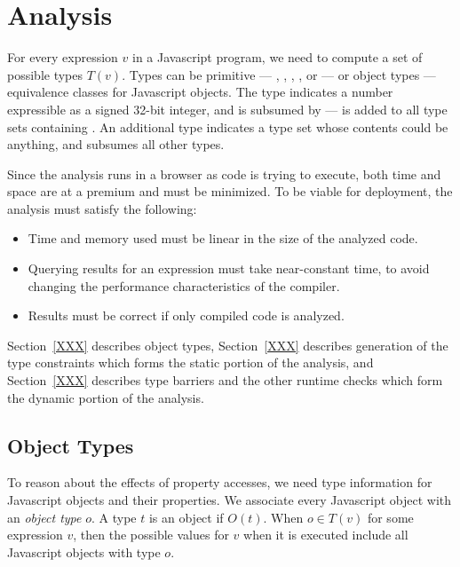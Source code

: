 
\section{Analysis}

For every expression $v$ in a Javascript program,
we need to compute a set of possible types $T(v)$.
Types can be primitive --- , , ,
, 
or  --- or object types --- equivalence classes for
Javascript objects.
The  type indicates a number expressible as a signed 32-bit integer,
and is subsumed by  ---  is added to all type
sets containing .
An additional type  indicates a type set whose contents
could be anything, and subsumes all other types.

Since the analysis runs in a browser as code is trying to execute,
both time and space are at a premium and must be minimized.
To be viable for deployment, the analysis must satisfy the following:

\begin{itemize}

\item Time and memory used must be linear in the size of the analyzed code.

\item Querying results for an expression must take near-constant time,
to avoid changing the performance characteristics of the compiler.

\item Results must be correct if only compiled code is analyzed.

\end{itemize}

Section~\ref{XXX} describes object types, Section~\ref{XXX} describes
generation of the type constraints which forms the static portion of
the analysis, and Section~\ref{XXX} describes type barriers and the
other runtime checks which form the dynamic portion of the analysis.

\subsection{Object Types}

To reason about the effects of property accesses, we need type information
for Javascript objects and their properties.
We associate every Javascript object with an {\it object type} $o$.
A type $t$ is an object if $O(t)$.
When $o \in T(v)$ for some expression $v$, then the possible values
for $v$ when it is executed include all Javascript objects with type $o$.

